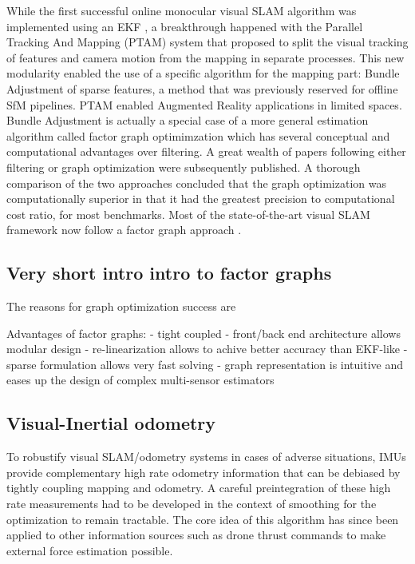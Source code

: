 While the first successful online monocular visual SLAM algorithm was implemented using an EKF \cite{davison2007monoslam}, a breakthrough happened with the 
Parallel Tracking And Mapping (PTAM) system \cite{klein2009parallel} that proposed to split the visual tracking of features and camera motion from the 
mapping in separate processes. This new modularity enabled the use of a specific algorithm for the mapping part: Bundle Adjustment \cite{triggs1999bundle, schoenberger2016sfm} of sparse 
features, a method that was previously reserved for offline SfM pipelines. PTAM enabled Augmented Reality applications in limited spaces. Bundle Adjustment 
is actually a special case of a more general estimation algorithm called factor graph optimimzation which has several conceptual and computational advantages over filtering.
A great wealth of papers following either filtering or graph optimization were subsequently published. A thorough comparison 
of the two approaches \cite{strasdat2012visual} concluded that the graph optimization was computationally superior in that it had the greatest precision to 
computational cost ratio, for most benchmarks. Most of the state-of-the-art visual SLAM framework now follow a factor graph approach 
\cite{forster2017-TRO, mur2015orb, qin2018vins, leutenegger2015keyframe, ferrera2021ov}.


\subsection{Very short intro intro to factor graphs}
The reasons for graph optimization success are


Advantages of factor graphs: 
- tight coupled
- front/back end architecture allows modular design
- re-linearization allows to achive better accuracy than EKF-like
- sparse formulation allows very fast solving
- graph representation is intuitive and eases up the design of complex multi-sensor estimators


\subsection{Visual-Inertial odometry}
To robustify visual SLAM/odometry systems in cases of adverse situations, IMUs provide complementary high rate odometry information that can 
be debiased by tightly coupling mapping and odometry. A careful preintegration \cite{lupton-09,forster2017-TRO} of these high 
rate measurements had to be developed in the context of smoothing for the optimization to remain tractable. The core idea of this algorithm has 
since been applied to other information sources such as drone thrust commands \cite{nisar2019vimo} to make external force estimation possible.

